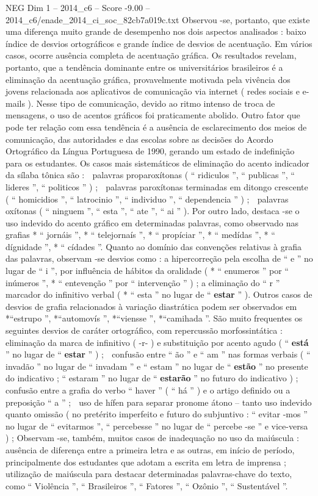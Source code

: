 \begin{textsample}{NEG Dim 1 – 2014\_c6 – Score -9.00 – 2014\_c6/enade\_2014\_ci\_soc\_82cb7a019c.txt}
Observou -se, portanto, que existe uma diferença muito grande de desempenho nos dois aspectos analisados : baixo índice de desvios ortográficos e grande índice de desvios de acentuação.
Em vários casos, ocorre ausência completa de acentuação gráfica.
Os resultados revelam, portanto, que a tendência dominante entre os universitários brasileiros é a eliminação da acentuação gráfica, provavelmente motivada pela vivência dos jovens relacionada aos aplicativos de comunicação via internet ( redes sociais e e-mails ).
Nesse tipo de comunicação, devido ao ritmo intenso de troca de mensagens, o uso de acentos gráficos foi praticamente abolido.
Outro fator que pode ter relação com essa tendência é a ausência de esclarecimento dos meios de comunicação, das autoridades e das escolas sobre as decisões do Acordo Ortográfico da Língua Portuguesa de 1990, gerando um estado de indefinição para os estudantes.
Os casos mais sistemáticos de eliminação do acento indicador da sílaba tônica são :  palavras proparoxítonas ( “ ridiculos ”, “ publicas ”, “ lideres ”, “ politicos ” ) ;  palavras paroxítonas terminadas em ditongo crescente ( “ homicidios ”, “ latrocinio ”, “ individuo ”, “ dependencia ” ) ;  palavras oxítonas ( “ ninguem ”, “ esta ”, “ ate ”, “ ai ” ).
Por outro lado, destaca -se o uso indevido do acento gráfico em determinadas palavras, como observado nas grafias * “ jornáis ”, * “ telejornaís ”, * “ propíciar ”, * “ medídas ”, * “ dígnidade ”, * “ cídades ”.
Quanto ao domínio das convenções relativas à grafia das palavras, observam -se desvios como : a hipercorreção pela escolha de “ e ” no lugar de “ i ”, por influência de hábitos da oralidade ( * “ enumeros ” por “ inúmeros ”, * “ entevenção ” por “ intervenção ” ) ; a eliminação do “ r ” marcador do infinitivo verbal ( * “ esta ” no lugar de “ \textbf{estar} ” ).
Outros casos de desvios de grafia relacionados à variação diastrática podem ser observados em *“estrupo ”, *“automovís ”, *“viensse ”, *“camihada ”.
São muito frequentes os seguintes desvios de caráter ortográfico, com repercussão morfossintática :  eliminação da marca de infinitivo ( -r- ) e substituição por acento agudo ( “ \textbf{está} ” no lugar de “ \textbf{estar} ” ) ;  confusão entre “ ão ” e “ am ” nas formas verbais ( “ invadão ” no lugar de “ invadam ” e “ estam ” no lugar de “ \textbf{estão} ” no presente do indicativo ; “ estaram ” no lugar de “ \textbf{estarão} ” no futuro do indicativo ) ;  confusão entre a grafia do verbo “ haver ” ( “ há ” ) e o artigo definido ou a preposição “ a ” ;  uso de hífen para separar pronome átono – tanto uso indevido quanto omissão ( no pretérito imperfeito e futuro do subjuntivo : “ evitar -mos ” no lugar de “ evitarmos ”, “ percebesse ” no lugar de “ percebe -se ” e vice-versa ) ; Observam -se, também, muitos casos de inadequação no uso da maiúscula : ausência de diferença entre a primeira letra e as outras, em início de período, principalmente dos estudantes que adotam a escrita em letra de imprensa ; utilização de maiúscula para destacar determinadas palavras-chave do texto, como “ Violência ”, “ Brasileiros ”, “ Fatores ”, “ Ozônio ”, “ Sustentável ”.

\end{textsample}

